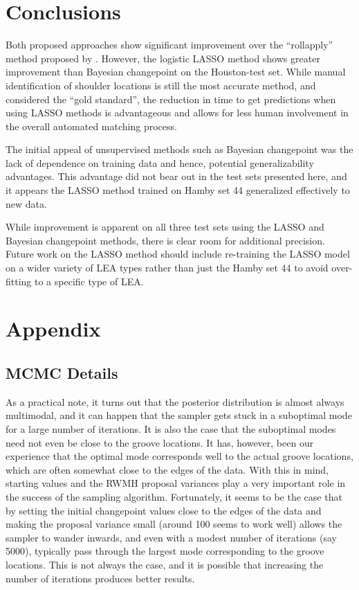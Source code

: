 \documentclass[12pt]{article}
\begin{document}
\section{Conclusions}

Both proposed approaches show significant improvement over the
``rollapply'' method proposed by \cite{Hare1}. However, the logistic
LASSO method shows greater improvement than Bayesian changepoint on the
Houston-test set. While manual identification of shoulder locations is
still the most accurate method, and considered the ``gold standard'',
the reduction in time to get predictions when using LASSO methods is
advantageous and allows for less human involvement in the overall
automated matching process.

The initial appeal of unsupervised methods such as Bayesian changepoint
was the lack of dependence on training data and hence, potential
generalizability advantages. This advantage did not bear out in the test
sets presented here, and it appears the LASSO method trained on Hamby
set 44 generalized effectively to new data.

While improvement is apparent on all three test sets using the LASSO and
Bayesian changepoint methods, there is clear room for additional
precision. Future work on the LASSO method should include re-training
the LASSO model on a wider variety of LEA types rather than just the
Hamby set 44 to avoid over-fitting to a specific type of LEA.

\section{Appendix}

\subsection{MCMC Details}

As a practical note, it turns out that the posterior distribution is
almost always multimodal, and it can happen that the sampler gets stuck
in a suboptimal mode for a large number of iterations. It is also the
case that the suboptimal modes need not even be close to the groove
locations. It has, however, been our experience that the optimal mode
corresponds well to the actual groove locations, which are often
somewhat close to the edges of the data. With this in mind, starting
values and the RWMH proposal variances play a very important role in the
success of the sampling algorithm. Fortunately, it seems to be the case
that by setting the initial changepoint values close to the edges of the
data and making the proposal variance small (around 100 seems to work
well) allows the sampler to wander inwards, and even with a modest
number of iterations (say 5000), typically pass through the largest mode
corresponding to the groove locations. This is not always the case, and
it is possible that increasing the number of iterations produces better
results.
\end{document}
